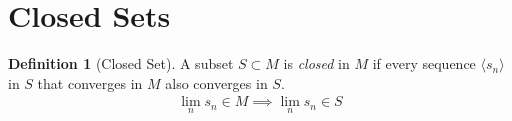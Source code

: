 \documentclass{amsart}
\numberwithin{equation}{section}
\let\oldendproof\endproof
\renewenvironment{proof}[1][\proofname]{%
  \setcounter{case}{0}
  \setcounter{step}{0}
  \oldproof[#1]%
}{\oldendproof}
\theoremstyle{plain}
\newtheorem{theorem}{Theorem}[section]
\theoremstyle{definition}
\newtheorem{definition}[theorem]{Definition}
\theoremstyle{remark}
\begin{document}
\section{Closed Sets}

\begin{definition}[Closed Set]
  A subset $S\subset M$ is \emph{closed} in $M$ if every sequence $\langle s_n \rangle$ in $S$ that converges in $M$ also converges in $S$.
  \begin{align}
    \lim_n s_n \in M \implies \lim_n s_n \in S
  \end{align}
\end{definition}

%
\end{document}
